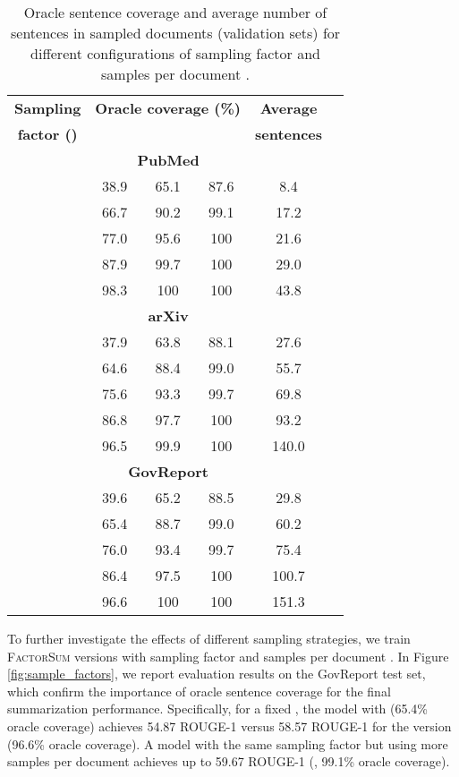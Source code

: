 \documentclass[11pt,table]{article}
\newcommand{\modelname}{FactorSum}
\begin{document}
\begin{table}[H]
  \centering
  \setlength{}
  \begin{tabular}{cccccc}
    \toprule
    \multicolumn{1}{c}{\textbf{Sampling}} & \multicolumn{3}{c}{\textbf{Oracle coverage (\%)}} & \textbf{Average} \\
\multicolumn{1}{c}{\textbf{factor ()}} &  &  &  & \textbf{sentences} \\
    \midrule
    \multicolumn{5}{c}{\textbf{PubMed}} \\
    \midrule
     & 38.9 & 65.1 & 87.6 & 8.4  \\
     & 66.7 & 90.2 & 99.1 & 17.2  \\
     & 77.0 & 95.6 & 100 & 21.6  \\
     & 87.9 & 99.7 & 100 & 29.0 \\
     & 98.3 & 100 & 100 & 43.8 \\
    \midrule
    \multicolumn{5}{c}{\textbf{arXiv}} \\
    \midrule
     & 37.9 & 63.8 & 88.1 & 27.6  \\
     & 64.6 & 88.4 & 99.0 & 55.7  \\
     & 75.6 & 93.3 & 99.7 & 69.8  \\
     & 86.8 & 97.7 & 100 & 93.2 \\
     & 96.5 & 99.9 & 100 & 140.0 \\
    \midrule
    \multicolumn{5}{c}{\textbf{GovReport}} \\
    \midrule
     & 39.6 & 65.2 & 88.5 & 29.8  \\
     & 65.4 & 88.7 & 99.0 & 60.2  \\
     & 76.0 & 93.4 & 99.7 & 75.4  \\
     & 86.4 & 97.5 & 100 & 100.7 \\
     & 96.6 & 100 & 100 & 151.3 \\
    \bottomrule
  \end{tabular}
  \caption{Oracle sentence coverage and average number of sentences in sampled documents (validation sets) for different configurations of sampling factor  and samples per document .}\label{tab:document_sampling}
\end{table}

To further investigate the effects of different sampling strategies, we train \textsc{\modelname} versions with  sampling factor  and samples per document . In Figure \ref{fig:sample_factors}, we report evaluation results on the GovReport test set, which confirm the importance of oracle sentence coverage for the final summarization performance. Specifically, for a fixed , the model with  (65.4\% oracle coverage) achieves 54.87 ROUGE-1 versus 58.57 ROUGE-1 for the version  (96.6\% oracle coverage). A model with the same sampling factor  but using more samples per document achieves up to 59.67 ROUGE-1 (, 99.1\% oracle coverage).
\end{document}
